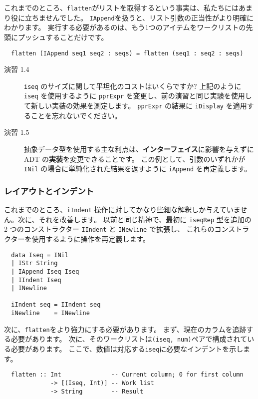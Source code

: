 \documentclass{jarticle}
\begin{document}
これまでのところ、\texttt{flatten}がリストを取得するという事実は、私たちにはあまり役に立ちませんでした。
\texttt{IAppend}を扱うと、リスト引数の正当性がより明確にわかります。
実行する必要があるのは、もう1つのアイテムをワークリストの先頭にプッシュすることだけです。

\begin{verbatim}
  flatten (IAppend seq1 seq2 : seqs) = flatten (seq1 : seq2 : seqs)
\end{verbatim}

\begin{description}
	\item[演習 1.4] \texttt{iseq} のサイズに関して平坦化のコストはいくらですか?
	      上記のように \texttt{iseq} を使用するように \texttt{pprExpr} を変更し、前の演習と同じ実験を使用して新しい実装の効果を測定します。
	      \texttt{pprExpr} の結果に \texttt{iDisplay} を適用することを忘れないでください。

	\item[演習 1.5] 抽象データ型を使用する主な利点は、\textbf{インターフェイス}に影響を与えずに ADT の\textbf{実装}を変更できることです。
	      この例として、引数のいずれかが \texttt{INil} の場合に単純化された結果を返すように \texttt{iAppend} を再定義します。
\end{description}

\subsubsection{レイアウトとインデント}

これまでのところ、\texttt{iIndent} 操作に対してかなり些細な解釈しか与えていません。次に、それを改善します。
以前と同じ精神で、最初に \texttt{iseqRep} 型を追加の 2 つのコンストラクター \texttt{IIndent} と \texttt{INewline} で拡張し、
これらのコンストラクターを使用するように操作を再定義します。

\begin{verbatim}
  data Iseq = INil
  | IStr String
  | IAppend Iseq Iseq
  | IIndent Iseq
  | INewline

  iIndent seq = IIndent seq
  iNewline    = INewline
\end{verbatim}

次に、\texttt{flatten}をより強力にする必要があります。
まず、現在のカラムを追跡する必要があります。
次に、そのワークリストは\texttt{(iseq, num)}ペアで構成されている必要があります。
ここで、数値は対応する\texttt{iseq}に必要なインデントを示します。

\begin{verbatim}
  flatten :: Int              -- Current column; 0 for first column
             -> [(Iseq, Int)] -- Work list
             -> String        -- Result
\end{verbatim}
\end{document}

